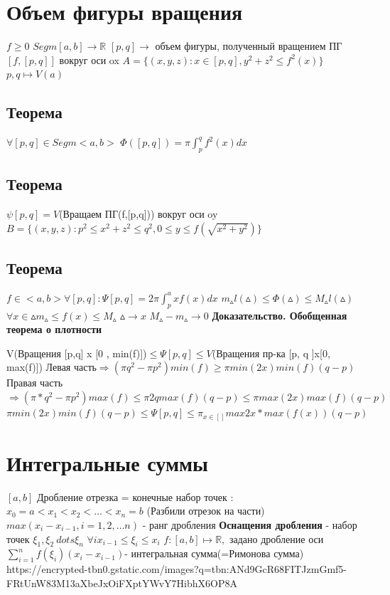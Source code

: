 \documentclass[12pt, a4paper]{article}
\newcommand{\nl}{\newline}
\begin{document}
	\cfoot{}
	
	\section{Объем фигуры вращения} 
	$f\geq 0 $\nl
	$Segm[a,b] \rightarrow \mathbb{R}$ \nl
	$ [p, q]\rightarrow$ объем  фигуры,  полученный вращением ПГ$ [f,[p,q]] $ вокруг оси ox \nl
	$ A= \{(x,y,z): x \in [p,q] , y^2+z^2 \leq f^2(x) \}$ \nl
	$ p,q \mapsto V(a)$ \nl
	\subsection{Теорема}
	$ \forall [p,q] \in Segm<a, b> $ \nl
	$ \Phi([p, q ]) = \pi \int_p^q f^2(x)dx $
	\subsection{Теорема}
	
	$  \psi [p,q] = V$(Вращаем ПГ(f,[p,q])) вокруг оси  oy \nl
	$ B = \{(x, y, z) : p^2 \leq x^2 + z^2 \leq q^2, 0\leq y \leq f(\sqrt{x^2 + y^2})\} $ \nl
	\subsection{Теорема}
	$ f \in <a , b> \forall [p,q] : \Psi [p, q] = 2\pi \int_p^a x f(x)dx $ \nl
	$ m_\vartriangle l(\vartriangle) \leq \Phi(\vartriangle) \leq M_\vartriangle l(\vartriangle)   $ \nl
	$ \forall x \in \vartriangle  m_\vartriangle \leq f(x) \leq M_\vartriangle $ \nl
	$  \vartriangle \rightarrow x$    $M_\vartriangle - m_\vartriangle \rightarrow 0 $ \nl
	\textbf{Доказательство. Обобщенная теорема о плотности} \nl
	
	V(Вращения [p,q] x [0 , min(f)])$  \leq \Psi[p, q] \leq V$(Вращения пр-ка [p, q ]x[0, max(f)]) \nl
	Левая часть$  \Longrightarrow (\pi q^2 - \pi p^2)min(f) \geq \pi min(2x)min(f) (q - p)$    \nl          
	Правая часть $ \Longrightarrow( \pi*q^2 - \pi p^2) max(f) \leq  \pi 2q max(f)(q - p) \leq \pi max(2x)max(f)(q - p) $ \nl
	$\pi min(2x)min(f)(q - p )\leq \Psi[p ,q ] \leq  \pi_{x\in[]}max2x * max(f(x))(q-p)$\nl
	
	\section{Интегральные суммы}
	$ [a, b] $ Дробление отрезка  = конечные набор точек : \nl
	$ x_0 = a < x_1 < x_2 < \dots < x_n = b $ (Разбили отрезок на части)\nl
	$ max(x_i - x_{i - 1}, i = 1,2, \dots n)$ - ранг дробления \nl
	\textbf{Оснащения дробления } - набор точек $ \xi_1, \xi_2 \ dots \xi_n $ \nl
	$ \forall i x_{i - 1 } \leq \xi_i \leq x_i$ \nl
	$ f: [a,b] \mapsto \mathbb{R}, $ задано дробление оси \nl
	$ \sum_{i=1}^n f(\xi_i)(x_i -x_{i -1})$- интегральная сумма(=Римонова сумма) \nl
	https://encrypted-tbn0.gstatic.com/images?q=tbn:ANd9GcR68FITJzmGmf5-FRtUnW83M13aXbeJxOiFXptYWvY7HibhX6OP8A \nl
	
\end{document}
